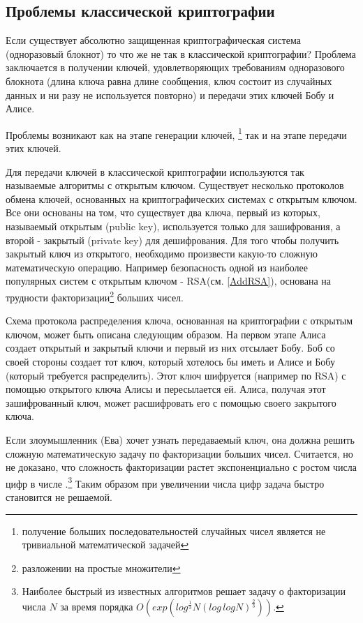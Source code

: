 \subsection{Проблемы классической криптографии}

Если существует абсолютно защищенная криптографическая система (одноразовый блокнот) то
что же не так в классической криптографии? Проблема заключается в
получении ключей, удовлетворяющих требованиям одноразового блокнота
(длина ключа равна длине сообщения, ключ состоит из случайных данных и
ни разу не используется повторно) и передачи этих ключей Бобу и Алисе.

Проблемы возникают как на этапе генерации ключей, \footnote{получение больших
последовательностей случайных чисел является не тривиальной
математической задачей} так и на этапе передачи этих ключей. 

Для передачи ключей в классической криптографии используются так
называемые алгоритмы с открытым ключом. Существует несколько
протоколов обмена ключей, основанных на криптографических системах с
открытым ключом. Все они основаны на том, что существует два ключа,
первый из которых, называемый открытым (public key), используется только
для зашифрования, а второй - закрытый (private key) для дешифрования. 
Для того чтобы получить закрытый ключ из открытого,
необходимо произвести какую-то сложную математическую
операцию. Например безопасность одной из наиболее популярных систем с
открытым ключом - RSA(см. \ref {AddRSA}), основана на трудности
факторизации\footnote{разложении на простые множители} больших чисел.

Схема протокола распределения ключа, основанная на криптографии с
открытым ключом, может быть описана следующим образом. На первом этапе
Алиса создает открытый и закрытый ключи и первый из них отсылает Бобу. 
Боб со своей стороны создает тот ключ, который хотелось бы иметь и
Алисе и Бобу (который требуется распределить). Этот ключ шифруется
(например по RSA) с помощью открытого ключа Алисы и пересылается
ей. Алиса, получая этот зашифрованный ключ, может расшифровать его с
помощью своего закрытого ключа.

Если злоумышленник (Ева) хочет узнать передаваемый ключ, она должна
решить сложную математическую задачу по факторизации больших
чисел. Считается, но не доказано, что сложность факторизации растет
экспоненциально с ростом числа цифр в числе
\cite{bPhisQuantInfo}.\footnote{Наиболее быстрый из известных
  алгоритмов решает задачу о факторизации числа $N$ за время порядка
  $O\left(exp\left(log^{\frac{1}{3}}N\left(log \, log N\right)^{\frac{2}{3}}\right)\right)$.} 
Таким образом при увеличении числа цифр задача быстро становится не решаемой.

